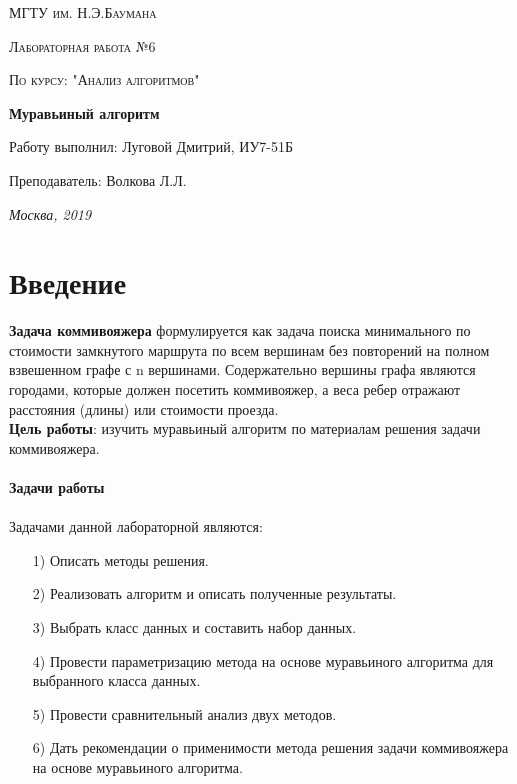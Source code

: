 \documentclass[a4paper,12pt]{report}
\begin{document}
\begin{titlepage}
	\centering
	{\scshape\LARGE МГТУ им. Н.Э.Баумана \par}
	\vspace{4cm}
	{\scshape\Large Лабораторная работа №6\par}
	\vspace{0.5cm}	
	{\scshape\Large По курсу: "Анализ алгоритмов"\par}
	\vspace{2cm}
	{\huge\bfseries Муравьиный алгоритм\par}
	\vspace{3cm}
	\Large Работу выполнил: Луговой Дмитрий, ИУ7-51Б\par
	\vspace{0.5cm}
	\Large Преподаватель:  Волкова Л.Л.\par

	\vfill
	\large \textit {Москва, 2019} \par
\end{titlepage}

\setcounter{page}{2}

\tableofcontents

\newpage
\chapter*{Введение}
\hspace{0.6cm}  \textbf{Задача коммивояжера} формулируется как задача поиска минимального по стоимости замкнутого маршрута по всем вершинам без повторений на полном взвешенном графе с n вершинами. Содержательно вершины графа являются городами, которые должен посетить коммивояжер, а веса ребер отражают расстояния (длины) или стоимости проезда. \\

\textbf{Цель работы}: изучить муравьиный алгоритм по материалам решения задачи коммивояжера.\\\\

\textbf{\LARGE Задачи работы}\\\\
Задачами данной лабораторной являются:
\begin{enumerate}
\item[1)] Описать методы решения.
\item[2)] Реализовать алгоритм и описать полученные результаты.
\item[3)] Выбрать класс данных и составить набор данных.
\item[4)] Провести параметризацию метода на основе муравьиного алгоритма для выбранного класса данных.
\item[5)] Провести сравнительный анализ двух методов.
\item[6)] Дать рекомендации о применимости метода решения задачи коммивояжера на основе муравьиного алгоритма.
\end{enumerate}
\end{document}
